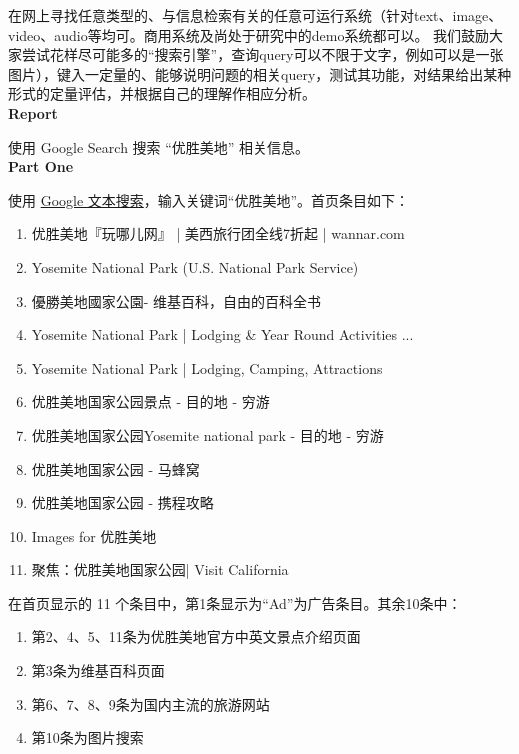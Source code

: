 \begin{homeworkProblem}

    在网上寻找任意类型的、与信息检索有关的任意可运行系统（针对text、image、video、audio等均可。商用系统及尚处于研究中的demo系统都可以。
    我们鼓励大家尝试花样尽可能多的“搜索引擎”，查询query可以不限于文字，例如可以是一张图片），键入一定量的、能够说明问题的相关query，测试其功能，对结果给出某种形式的定量评估，并根据自己的理解作相应分析。
    \\

    \textbf{\large Report}

    使用 Google Search 搜索 “优胜美地” 相关信息。
    \\

    \textbf{Part One}

    使用 \href{https://www.google.com}{Google 文本搜索}，输入关键词“优胜美地”。首页条目如下：
    
    \begin{enumerate}
        \item 优胜美地『玩哪儿网』 | 美西旅行团全线7折起 | wannar.com‎
        \item Yosemite National Park (U.S. National Park Service)
        \item 優勝美地國家公園- 维基百科，自由的百科全书
        \item Yosemite National Park | Lodging \& Year Round Activities ...
        \item Yosemite National Park | Lodging, Camping, Attractions
        \item 优胜美地国家公园景点 - 目的地 - 穷游
        \item 优胜美地国家公园Yosemite national park - 目的地 - 穷游
        \item 优胜美地国家公园 - 马蜂窝
        \item 优胜美地国家公园 - 携程攻略
        \item Images for 优胜美地
        \item 聚焦：优胜美地国家公园| Visit California
    \end{enumerate}

    在首页显示的 11 个条目中，第1条显示为“Ad”为广告条目。其余10条中：

    \begin{enumerate}
        \item 第2、4、5、11条为优胜美地官方中英文景点介绍页面
        \item 第3条为维基百科页面
        \item 第6、7、8、9条为国内主流的旅游网站
        \item 第10条为图片搜索
    \end{enumerate}


\end{homeworkProblem}
